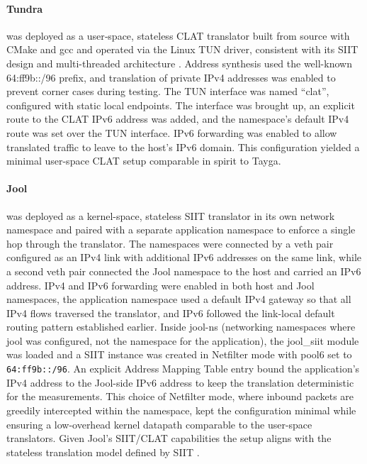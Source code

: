 \paragraph{Tundra} 
was deployed as a user‑space, stateless CLAT translator built from source with CMake and gcc and operated via the Linux TUN driver, consistent with its SIIT design and multi-threaded architecture \cite{rfc7915,labuda_tundra_nat64}. Address synthesis used the well-known 64:ff9b::/96 prefix, and translation of private IPv4 addresses was enabled to prevent corner cases during testing. The TUN interface was named “clat”, configured with static local endpoints. The interface was brought up, an explicit route to the CLAT IPv6 address was added, and the namespace’s default IPv4 route was set over the TUN interface. IPv6 forwarding was enabled to allow translated traffic to leave to the host’s IPv6 domain. This configuration yielded a minimal user-space CLAT setup comparable in spirit to Tayga\cite{labuda_tundra_nat64}.

\paragraph{Jool}
was deployed as a kernel-space, stateless SIIT translator in its own network namespace and paired with a separate application namespace to enforce a single hop through the translator. The namespaces were connected by a veth pair configured as an IPv4 link with additional IPv6 addresses on the same link, while a second veth pair connected the Jool namespace to the host and carried an IPv6 address. IPv4 and IPv6 forwarding were enabled in both host and Jool namespaces, the application namespace used a default IPv4 gateway so that all IPv4 flows traversed the translator, and IPv6 followed the link-local default routing pattern established earlier. Inside jool-ns (networking namespaces where jool was configured, not the namespace for the application), the jool\_siit module was loaded and a SIIT instance was created in Netfilter mode with pool6 set to \texttt{64:ff9b::/96}. An explicit Address Mapping Table entry bound the application’s IPv4 address to the Jool-side IPv6 address to keep the translation deterministic for the measurements. This choice of Netfilter mode, where inbound packets are greedily intercepted within the namespace, kept the configuration minimal while ensuring a low-overhead kernel datapath comparable to the user-space translators\cite{jool_introduction}. Given Jool’s SIIT/CLAT capabilities the setup aligns with the stateless translation model defined by SIIT \cite{jool_introduction,rfc7915}.


